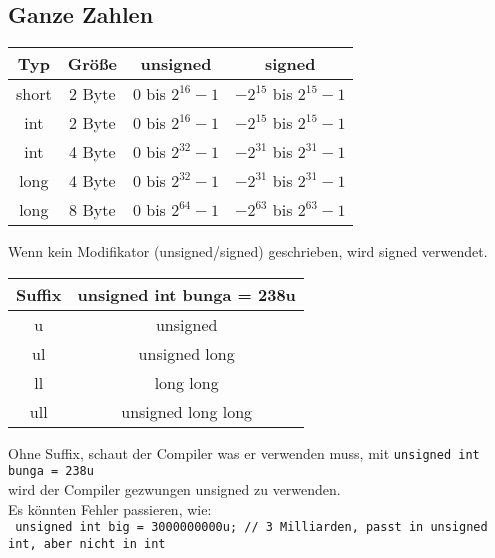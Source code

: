 \documentclass[a4paper,12pt,twoside]{article}
\begin{document}
\subsection{Ganze Zahlen}
\begin{center}
	\begin{tabular}{|c|c|c|c|}
    \hline
    Typ & Größe & unsigned & signed \\ 
    \hline 
    \hline 
    short & 2 Byte & 0 bis $2^{16}-1$ & $-2^{15}$ bis $2^{15}-1$ \\ 
    \hline
    int & 2 Byte & 0 bis $2^{16}-1$ & $-2^{15}$ bis $2^{15}-1$ \\ 
    int & 4 Byte & 0 bis $2^{32}-1$ & $-2^{31}$ bis $2^{31}-1$ \\
    \hline
    long & 4 Byte & 0 bis $2^{32}-1$ & $-2^{31}$ bis $2^{31}-1$ \\
    long & 8 Byte & 0 bis $2^{64}-1$ & $-2^{63}$ bis $2^{63}-1$ \\
    \hline 
  \end{tabular} 
\end{center}
Wenn kein Modifikator (unsigned/signed) geschrieben, wird signed verwendet.
\\
\begin{center}
  \begin{tabular}{|c|c|}
    \hline 
    Suffix & unsigned int bunga = 238u \\
    \hline 
    \hline
    u & unsigned \\  
    \hline
    ul & unsigned long \\
    \hline
    ll & long long \\ 
    \hline
    ull & unsigned long long \\
    \hline
  \end{tabular}
\end{center}
Ohne Suffix, schaut der Compiler was er verwenden muss, mit \verb|unsigned int bunga = 238u| \\ 
wird der Compiler gezwungen unsigned zu verwenden. \\ 
Es könnten Fehler passieren, wie: \\ 
\verb| unsigned int big = 3000000000u; // 3 Milliarden, passt in unsigned int, aber nicht in int| \\
\end{document}

